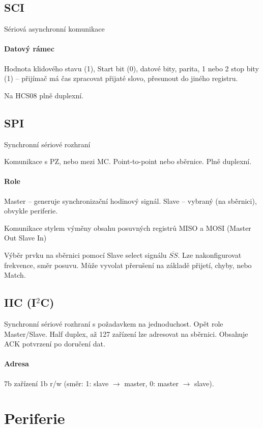 \documentclass[a4paper, 11pt]{report}
\begin{document}
\subsection{SCI}
Sériová asynchronní komunikace

\paragraph{Datový rámec} Hodnota klidového stavu (1), Start bit (0), datové bity, parita, 1 nebo 2 stop bity (1) -- přijímač má čas zpracovat přijaté slovo, přesunout do jiného registru.

Na HCS08 plně duplexní.

\subsection{SPI}
Synchronní sériové rozhraní

Komunikace s PZ, nebo mezi MC. Point-to-point nebo sběrnice. Plně duplexní.

\paragraph{Role} Master -- generuje synchronizační hodinový signál. Slave -- vybraný (na sběrnici), obvykle periferie.

Komunikace stylem výměny obsahu posuvných registrů MISO a MOSI (Master Out Slave In)

Výběr prvku na sběrnici pomocí Slave select signálu $\overline{SS}$. Lze nakonfigurovat frekvence, směr posuvu. Může vyvolat přerušení na základě přijetí, chyby, nebo Match.

\subsection{IIC (I$^2$C)}
Synchronní sériové rozhraní s požadavkem na jednoduchost. Opět role Master/Slave. Half duplex, až 127 zařízení lze adresovat na sběrnici. Obsahuje ACK potvrzení po doručení dat.

\paragraph{Adresa} 7b zařízení 1b r/w (směr: 1: slave $\to$ master, 0: master $\to$ slave).

\section{Periferie}
\end{document}

